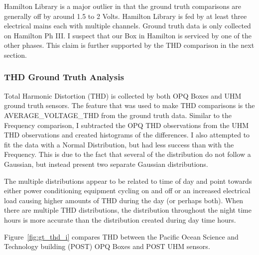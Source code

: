 Hamilton Library is a major outlier in that the ground truth comparisons are generally off by around 1.5 to 2 Volts. Hamilton Library is fed by at least three electrical mains each with multiple channels. Ground truth data is only collected on Hamilton Ph III. I suspect that our Box in Hamilton is serviced by one of the other phases. This claim is further supported by the THD comparison in the next section.

\subsubsection{THD Ground Truth Analysis}

Total Harmonic Distortion (THD) is collected by both OPQ Boxes and UHM ground truth sensors. The feature that was used to make THD comparisons is the AVERAGE\_VOLTAGE\_THD from the ground truth data. Similar to the Frequency comparison, I subtracted the OPQ THD observations from the UHM THD observations and created histograms of the differences. I also attempted to fit the data with a Normal Distribution, but had less success than with the Frequency. This is due to the fact that several of the distribution do not follow a Gaussian, but instead present two separate Gaussian distributions.

The multiple distributions appear to be related to time of day and point towards either power conditioning equipment cycling on and off or an increased electrical load causing higher amounts of THD during the day (or perhaps both). When there are multiple THD distributions, the distribution throughout the night time hours is more accurate than the distribution created during day time hours.

Figure~\ref{fig:gt_thd_i} compares THD between the Pacific Ocean Science and Technology building (POST) OPQ Boxes and POST UHM sensors.

